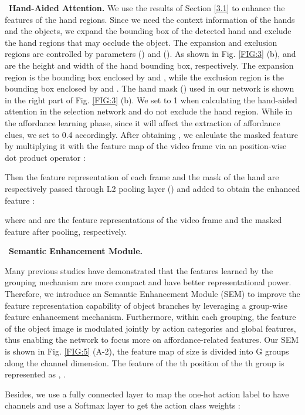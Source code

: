 \documentclass[journal,twoside]{IEEEtran}
\newcommand{\myPara}[1]{\vspace{5pt}\noindent~\textbf{#1} \quad}
\begin{document}
\myPara{Hand-Aided Attention.}
\label{hand-aided}
We use the results of Section \ref{3.1} to enhance the features of the hand regions. Since we need the context information of the hands and the objects, we expand the bounding box of the detected hand and exclude the hand regions that may occlude the object. The expansion and exclusion regions are controlled by parameters  () and  (). As shown in Fig. \ref{FIG:3} (b),  and  are the height and width of the hand bounding box, respectively. The expansion region is the bounding box enclosed by  and , while the exclusion region is the bounding box enclosed by  and . The hand mask () used in our network is shown in the right part of Fig. \ref{FIG:3} (b). We set  to 1 when calculating the hand-aided attention in the selection network and do not exclude the hand region. While in the affordance learning phase, since it will affect the extraction of affordance clues, we set  to 0.4 accordingly. After obtaining , we calculate the masked feature  by multiplying it with the feature map  of the video frame via an position-wise dot product operator :


Then the feature representation of each frame and the mask of the hand are respectively passed through L2 pooling layer () and added to obtain the enhanced feature :



where  and  are the feature representations of the video frame and the masked feature after pooling, respectively.

\label{SEM}
\myPara{Semantic Enhancement Module.}
 
Many previous studies \cite{singh2019hetconv,sun2019high,wu2018group} have demonstrated that the features learned by the grouping mechanism are more compact and have better representational power. Therefore, we introduce an Semantic Enhancement Module (SEM) to improve the feature representation capability of object branches by leveraging a group-wise feature enhancement mechanism. Furthermore, within each grouping, the feature of the object image is modulated jointly by action categories and global features, thus enabling the network to focus more on affordance-related features. Our SEM is shown in Fig. \ref{FIG:5} (A-2), the feature map of size  is divided into G groups along the channel dimension. The feature of the th position of the th group is represented as , . 

Besides, we use a fully connected layer  to map the one-hot action label to have  channels and use a Softmax layer to get the action class weights :
\end{document}
